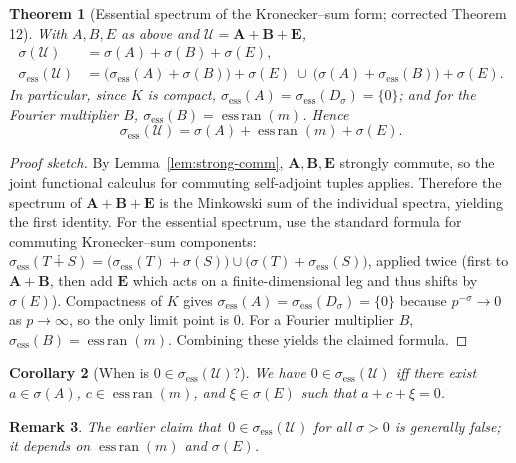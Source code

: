 \documentclass[10pt]{article}
\newtheorem{theorem}{Theorem}
\newtheorem{corollary}[theorem]{Corollary}
\newtheorem{remark}[theorem]{Remark}
\begin{document}
\begin{theorem}[Essential spectrum of the Kronecker–sum form; corrected Theorem 12]\label{thm:ess-12}
With \(A,B,E\) as above and \(\mathcal U=\mathbf A+\mathbf B+\mathbf E\),
\begin{align*}
\sigma(\mathcal U) &= \sigma(A)+\sigma(B)+\sigma(E),\\
\sigma_{\mathrm{ess}}(\mathcal U) &=
\big(\sigma_{\mathrm{ess}}(A)+\sigma(B)\big)+\sigma(E)\ \cup\
\big(\sigma(A)+\sigma_{\mathrm{ess}}(B)\big)+\sigma(E).
\end{align*}
In particular, since \(K\) is compact,
\(\sigma_{\mathrm{ess}}(A)=\sigma_{\mathrm{ess}}(D_\sigma)=\{0\}\);
and for the Fourier multiplier \(B\),
\(\sigma_{\mathrm{ess}}(B)=\operatorname{ess\,ran}(m)\).
Hence
\[
\sigma_{\mathrm{ess}}(\mathcal U)=\sigma(A)+\operatorname{ess\,ran}(m)+\sigma(E).
\]
\end{theorem}

\begin{proof}[Proof sketch]
By Lemma~\ref{lem:strong-comm}, \(\mathbf A,\mathbf B,\mathbf E\) strongly commute, so the joint functional calculus for commuting self-adjoint tuples applies.
Therefore the spectrum of \(\mathbf A+\mathbf B+\mathbf E\) is the Minkowski sum of the individual spectra, yielding the first identity.
For the essential spectrum, use the standard formula for commuting Kronecker–sum components:
\(\sigma_{\mathrm{ess}}(T\dotplus S)=\big(\sigma_{\mathrm{ess}}(T)+\sigma(S)\big)\cup\big(\sigma(T)+\sigma_{\mathrm{ess}}(S)\big)\),
applied twice (first to \(\mathbf A+\mathbf B\), then add \(\mathbf E\) which acts on a finite-dimensional leg and thus shifts by \(\sigma(E)\)).
Compactness of \(K\) gives \(\sigma_{\mathrm{ess}}(A)=\sigma_{\mathrm{ess}}(D_\sigma)=\{0\}\) because \(p^{-\sigma}\to 0\) as \(p\to\infty\), so the only limit point is \(0\).
For a Fourier multiplier \(B\), \(\sigma_{\mathrm{ess}}(B)=\operatorname{ess\,ran}(m)\).
Combining these yields the claimed formula.
\end{proof}

\begin{corollary}[When is \(0\in\sigma_{\mathrm{ess}}(\mathcal U)\)?]\label{cor:zero-in-ess}
We have \(0\in\sigma_{\mathrm{ess}}(\mathcal U)\) iff there exist
\(a\in\sigma(A)\), \(c\in\operatorname{ess\,ran}(m)\), and \(\xi\in\sigma(E)\)
such that \(a+c+\xi=0\).
\end{corollary}

\begin{remark}
The earlier claim that \(\,0\in\sigma_{\mathrm{ess}}(\mathcal U)\) for all \(\sigma>0\) is generally false; it depends on \(\operatorname{ess\,ran}(m)\) and \(\sigma(E)\).
\end{remark}
\end{document}
